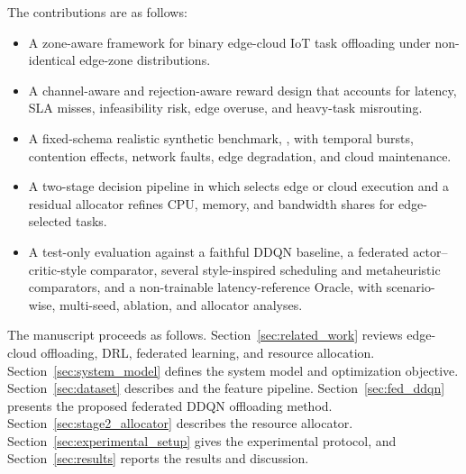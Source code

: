 The contributions are as follows:
\begin{itemize}
\item A zone-aware \fedddqn{} framework for binary edge-cloud IoT task offloading under non-identical edge-zone distributions.
\item A channel-aware and rejection-aware reward design that accounts for latency, SLA misses, infeasibility risk, edge overuse, and heavy-task misrouting.
\item A fixed-schema realistic synthetic benchmark, \dataset{}, with temporal bursts, contention effects, network faults, edge degradation, and cloud maintenance.
\item A two-stage decision pipeline in which \fedddqn{} selects edge or cloud execution and a residual allocator refines CPU, memory, and bandwidth shares for edge-selected tasks.
\item A test-only evaluation against a faithful DDQN baseline, a federated actor--critic-style comparator, several style-inspired scheduling and metaheuristic comparators, and a non-trainable latency-reference Oracle, with scenario-wise, multi-seed, ablation, and allocator analyses.
\end{itemize}

The manuscript proceeds as follows. Section~\ref{sec:related_work} reviews edge-cloud offloading, DRL, federated learning, and resource allocation. Section~\ref{sec:system_model} defines the system model and optimization objective. Section~\ref{sec:dataset} describes \dataset{} and the feature pipeline. Section~\ref{sec:fed_ddqn} presents the proposed federated DDQN offloading method. Section~\ref{sec:stage2_allocator} describes the resource allocator. Section~\ref{sec:experimental_setup} gives the experimental protocol, and Section~\ref{sec:results} reports the results and discussion.
